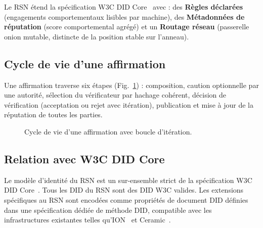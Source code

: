 \documentclass[11pt,a4paper,twocolumn]{article}
\begin{document}
Le RSN étend la spécification W3C DID Core~\cite{did2022} avec : des \textbf{Règles déclarées} (engagements comportementaux lisibles par machine), des \textbf{Métadonnées de réputation} (score comportemental agrégé) et un \textbf{Routage réseau} (passerelle onion mutable, distincte de la position stable sur l'anneau).

\subsection{Cycle de vie d'une affirmation}

Une affirmation traverse six étapes (Fig.~\ref{fig:lifecycle}) : composition, caution optionnelle par une autorité, sélection du vérificateur par hachage cohérent, décision de vérification (acceptation ou rejet avec itération), publication et mise à jour de la réputation de toutes les parties.

\begin{figure}[ht]
\centering
{}
\caption{Cycle de vie d'une affirmation avec boucle d'itération.}
\label{fig:lifecycle}
\end{figure}

\subsection{Relation avec W3C DID Core}

Le modèle d'identité du RSN est un sur-ensemble strict de la spécification W3C DID Core~\cite{did2022}. Tous les DID du RSN sont des DID W3C valides. Les extensions spécifiques au RSN sont encodées comme propriétés de document DID définies dans une spécification dédiée de méthode DID, compatible avec les infrastructures existantes telles qu'ION~\cite{buchner2021} et Ceramic~\cite{ceramic2023}.
\end{document}

